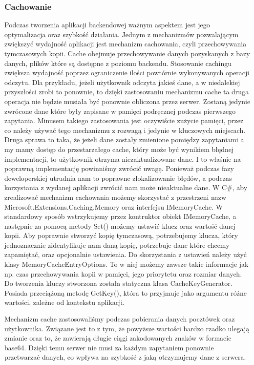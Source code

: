 \documentclass[a4paper,twoside,12pt]{book}
\begin{document}
\subsubsection{Cachowanie} 
Podczas tworzenia aplikacji backendowej ważnym aspektem jest jego optymalizacja oraz szybkość działania. Jednym z mechanizmów pozwalającym zwiększyć wydajność aplikacji jest mechanizm cachowania, czyli przechowywania tymczasowych kopii. Cache obejmuje przechowywanie danych pozyskanych z bazy danych, plików które są dostępne z poziomu backendu. Stosowanie cachingu zwiększa wydajność poprzez ograniczenie ilości powtórnie wykonywanych operacji odczytu. Dla przykładu, jeżeli użytkownik odczyta jakieś dane, a w niedalekiej przyszłości zrobi to ponownie, to dzięki zastosowaniu mechanizmu cache ta druga operacja nie będzie musiała być ponownie obliczona przez serwer. Zostaną jedynie zwrócone dane które były zapisane w pamięci podręcznej podczas pierwszego zapytania. Minusem takiego zastosowania jest oczywiście zużycie pamięci, przez co należy używać tego mechanizmu z rozwagą i jedynie w kluczowych miejscach. Druga sprawa to taka, że jeżeli dane zostały zmienione pomiędzy zapytaniami a my mamy dostęp do przestarzałego cache, który może być wynikiem błędnej implementacji, to użytkownik otrzyma niezaktualizowane dane. I to właśnie na poprawną implementację powinniśmy zwrócić uwagę. Ponieważ podczas fazy deweloperskiej utrudnia nam to poprawne zlokalizowanie błędów, a podczas korzystania z wydanej aplikacji zwrócić nam może nieaktualne dane. 
W C\#, aby zrealizować mechanizm cachowania możemy skorzystać z przestrzeni nazw Microsoft.Extensions.Caching.Memory oraz interfejsu IMemoryCache. W standardowy sposób wstrzykujemy przez kontruktor obiekt IMemoryCache, a następnie za pomocą metody Set() możemy ustawić klucz oraz wartość danej kopii. Aby poprawnie stworzyć kopię tymczasową, potrzebujemy klucza, który jednoznacznie zidentyfikuje nam daną kopię, potrzebuje dane które chcemy zapamiętać, oraz opcjonalnie ustawienia. Do skorzystania z ustawień należy użyć klasy MemoryCacheEntryOptions. To w niej możemy zawsze takie informacje jak np. czas przechowywania kopii w pamięci, jego priorytetu oraz rozmiar danych. Do tworzenia kluczy stworzona została statyczna klasa CacheKeyGenerator. Posiada przeciążoną metodę GetKey(), która to przyjmuje jako argumentu różne wartości, zależne od kontekstu aplikacji. 

Mechanizm cache zastosowaliśmy podczas pobierania danych pocztówek oraz użytkownika. Związane jest to z tym, że powyższe wartości bardzo rzadko ulegają zmianie oraz to, że zawierają długie ciągi zakodowanych znaków w formacie base64. Dzięki temu serwer nie musi za każdym zapytaniem ponownie przetwarzać danych, co wpływa na szybkość z jaką otrzymujemy dane z serwera.  
\end{document}
